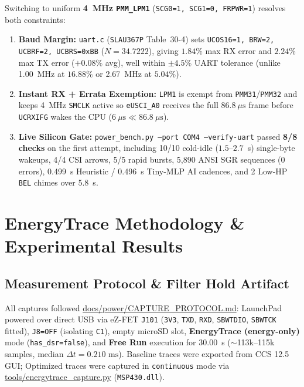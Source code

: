 \documentclass[conference]{IEEEtran}
\begin{document}
Switching to uniform \textbf{4~MHz \texttt{PMM\_LPM1}} (\texttt{SCG0=1, SCG1=0, FRPWR=1}) resolves both constraints:
\begin{enumerate}
    \item \textbf{Baud Margin:} \texttt{uart.c} (\texttt{SLAU367P} Table~30-4) sets \texttt{UCOS16=1, BRW=2, UCBRF=2, UCBRS=0xBB} ($N=34.7222$), giving $1.84\%$ max RX error and $2.24\%$ max TX error ($+0.08\%$ avg), well within $\pm 4.5\%$ UART tolerance (unlike 1.00~MHz at $16.88\%$ or 2.67~MHz at $5.04\%$).
    \item \textbf{Instant RX + Errata Exemption:} \texttt{LPM1} is exempt from \texttt{PMM31}/\texttt{PMM32} and keeps 4~MHz \texttt{SMCLK} active so \texttt{eUSCI\_A0} receives the full $86.8~\mu\text{s}$ frame before \texttt{UCRXIFG} wakes the CPU ($6~\mu\text{s} \ll 86.8~\mu\text{s}$).
    \item \textbf{Live Silicon Gate:} \texttt{power\_bench.py --port COM4 --verify-uart} passed \textbf{8/8 checks} on the first attempt, including 10/10 cold-idle ($1.5$--$2.7$~s) single-byte wakeups, 4/4 CSI arrows, 5/5 rapid bursts, 5,890 ANSI SGR sequences (0 errors), 0.499~s Heuristic / 0.496~s Tiny-MLP AI cadences, and 2 Low-HP \texttt{BEL} chimes over 5.8~s.
\end{enumerate}

\section{EnergyTrace Methodology \& Experimental Results}

\subsection{Measurement Protocol \& Filter Hold Artifact}
All captures followed \url{docs/power/CAPTURE_PROTOCOL.md}: LaunchPad powered over direct USB via eZ-FET \texttt{J101} (\texttt{3V3}, \texttt{TXD}, \texttt{RXD}, \texttt{SBWTDIO}, \texttt{SBWTCK} fitted), \texttt{J8=OFF} (isolating \texttt{C1}), empty microSD slot, \textbf{EnergyTrace (energy-only)} mode (\texttt{has\_dsr=false}), and \textbf{Free Run} execution for 30.00~s ($\sim$113k--115k samples, median $\Delta t=0.210\text{~ms}$). Baseline traces were exported from CCS 12.5 GUI; Optimized traces were captured in \texttt{continuous} mode via \url{tools/energytrace_capture.py} (\texttt{MSP430.dll}).
\end{document}
